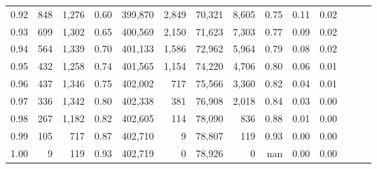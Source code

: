 \begin{tabular}{rrrrrrrrrrrrrr}
0.92 &    848 &  1,276 &  0.60 &  399,870 &    2,849 &  70,321 &   8,605 &  0.75 &  0.11 &      0.02 \\
0.93 &    699 &  1,302 &  0.65 &  400,569 &    2,150 &  71,623 &   7,303 &  0.77 &  0.09 &      0.02 \\
0.94 &    564 &  1,339 &  0.70 &  401,133 &    1,586 &  72,962 &   5,964 &  0.79 &  0.08 &      0.02 \\
0.95 &    432 &  1,258 &  0.74 &  401,565 &    1,154 &  74,220 &   4,706 &  0.80 &  0.06 &      0.01 \\
0.96 &    437 &  1,346 &  0.75 &  402,002 &      717 &  75,566 &   3,360 &  0.82 &  0.04 &      0.01 \\
0.97 &    336 &  1,342 &  0.80 &  402,338 &      381 &  76,908 &   2,018 &  0.84 &  0.03 &      0.00 \\
0.98 &    267 &  1,182 &  0.82 &  402,605 &      114 &  78,090 &     836 &  0.88 &  0.01 &      0.00 \\
0.99 &    105 &    717 &  0.87 &  402,710 &        9 &  78,807 &     119 &  0.93 &  0.00 &      0.00 \\
1.00 &      9 &    119 &  0.93 &  402,719 &        0 &  78,926 &       0 &   nan &  0.00 &      0.00 \\
\bottomrule
\end{tabular}
